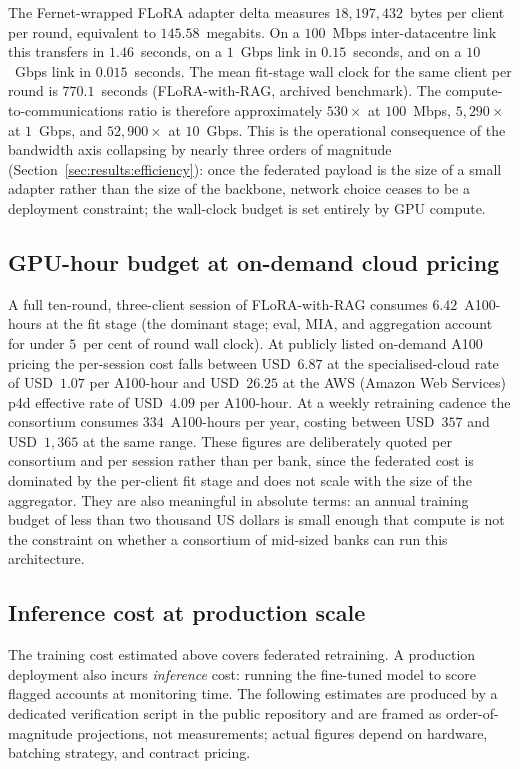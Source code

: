 \documentclass{report}
\begin{document}
The Fernet-wrapped FLoRA adapter delta measures $18{,}197{,}432$~bytes per client per round, equivalent to $145.58$~megabits. On a $100$~Mbps inter-datacentre link this transfers in $1.46$~seconds, on a $1$~Gbps link in $0.15$~seconds, and on a $10$~Gbps link in $0.015$~seconds. The mean fit-stage wall clock for the same client per round is $770.1$~seconds (FLoRA-with-RAG, archived benchmark). The compute-to-communications ratio is therefore approximately $530\times$ at $100$~Mbps, $5{,}290\times$ at $1$~Gbps, and $52{,}900\times$ at $10$~Gbps. This is the operational consequence of the bandwidth axis collapsing by nearly three orders of magnitude (Section~\ref{sec:results:efficiency}): once the federated payload is the size of a small adapter rather than the size of the backbone, network choice ceases to be a deployment constraint; the wall-clock budget is set entirely by GPU compute.

\subsection{GPU-hour budget at on-demand cloud pricing}

A full ten-round, three-client session of FLoRA-with-RAG consumes $6.42$~A100-hours at the fit stage (the dominant stage; eval, MIA, and aggregation account for under $5$~per cent of round wall clock). At publicly listed on-demand A100 pricing the per-session cost falls between USD~$6.87$ at the specialised-cloud rate of USD~$1.07$ per A100-hour and USD~$26.25$ at the AWS (Amazon Web Services) p4d effective rate of USD~$4.09$ per A100-hour. At a weekly retraining cadence the consortium consumes $334$~A100-hours per year, costing between USD~$357$ and USD~$1{,}365$ at the same range. These figures are deliberately quoted per consortium and per session rather than per bank, since the federated cost is dominated by the per-client fit stage and does not scale with the size of the aggregator. They are also meaningful in absolute terms: an annual training budget of less than two thousand US dollars is small enough that compute is not the constraint on whether a consortium of mid-sized banks can run this architecture.

\subsection{Inference cost at production scale}
\label{sec:meth:inference-cost}

The training cost estimated above covers federated retraining. A production deployment also incurs \textit{inference} cost: running the fine-tuned model to score flagged accounts at monitoring time. The following estimates are produced by a dedicated verification script in the public repository and are framed as order-of-magnitude projections, not measurements; actual figures depend on hardware, batching strategy, and contract pricing.
\end{document}
